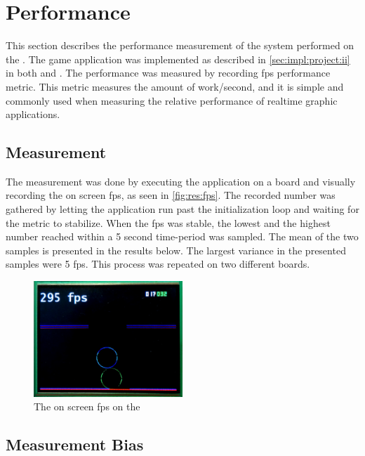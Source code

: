 
\section{Performance}
\label{sec:res:perf}

This section describes the performance measurement of the system performed on the {\DK}.
The game application was implemented as described in \autoref{sec:impl:project:ii} in both {\C} and {\rust}.
The performance was measured by recording \gls{fps} performance metric.
This metric measures the amount of work/second, and it is simple and commonly used when measuring the relative performance of realtime graphic applications.

\subsection{Measurement}
The measurement was done by executing the application on a {\DK} board and visually recording the on screen \gls{fps}, as seen in \autoref{fig:res:fps}.
The recorded number was gathered by letting the application run past the initialization loop and waiting for the metric to stabilize.
When the \gls{fps} was stable, the lowest and the highest number reached within a 5 second time-period was sampled.
The mean of the two samples is presented in the results below.
The largest variance in the presented samples were 5 \gls{fps}.
This process was repeated on two different {\DK} boards.

\begin{figure}[H]
  \begin{center}
    \includegraphics[width=0.5\textwidth]{figures/game-fps}
  \end{center}
  \caption{The on screen \gls{fps} on the {\DK}}
  \label{fig:res:fps}
\end{figure}


\subsection{Measurement Bias}
\label{sec:perf:bias}

